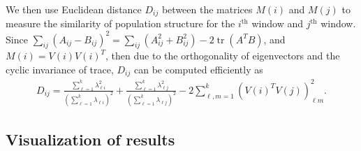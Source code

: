 \documentclass[11pt, oneside]{article}   	%
\DeclareMathOperator{\tr}{tr}
\begin{document}
We then use
Euclidean distance $D_{ij}$ between the matrices $M(i)$ and $M(j)$ 
to measure the similarity of population structure for the $i^\text{th}$ window and $j^\text{th}$ window. 
Since 
$\sum_{ij} (A_{ij}-B_{ij})^2 = \sum_{ij} (A^2_{ij} + B^2_{ij}) - 2 \tr(A^T B)$,
and $M(i) = V(i) V(i)^T$,
then due to the orthogonality of eigenvectors and the cyclic invariance of trace,
$D_{ij}$ can be computed efficiently as
\begin{align}
    D_{ij} 
    = 
    \frac{ \sum_{\ell=1}^k \lambda_{\ell i}^2 }{ (\sum_{\ell=1}^k \lambda_{\ell i})^2 }
    + \frac{ \sum_{\ell=1}^k \lambda_{\ell j}^2 }{ (\sum_{\ell=1}^k \lambda_{\ell j})^2 }
    - 2 \sum_{\ell, m=1}^k (V(i)^T V(j))^2_{\ell m} .
\end{align}


\subsection{Visualization of results}
\end{document}
